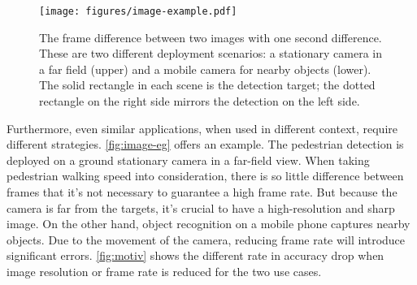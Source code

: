 \begin{figure}
  \centering
  \texttt{[image: figures/image-example.pdf]}
  \caption{The frame difference between two images with one second difference.
    These are two different deployment scenarios: a stationary camera in a far
    field (upper) and a mobile camera for nearby objects (lower). The solid
    rectangle in each scene is the detection target; the dotted rectangle on the
    right side mirrors the detection on the left side. }
  \label{fig:image-eg}
\end{figure}

Furthermore, even similar applications, when used in different context, require
different strategies. \autoref{fig:image-eg} offers an example. The pedestrian
detection is deployed on a ground stationary camera in a far-field view. When
taking pedestrian walking speed into consideration, there is so little
difference between frames that it's not necessary to guarantee a high frame
rate. But because the camera is far from the targets, it's crucial to have a
high-resolution and sharp image. On the other hand, object recognition on a
mobile phone captures nearby objects. Due to the movement of the camera,
reducing frame rate will introduce significant errors. \autoref{fig:motiv} shows
the different rate in accuracy drop when image resolution or frame rate is
reduced for the two use cases.

